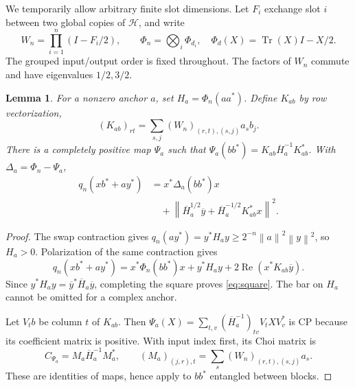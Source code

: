 \documentclass[11pt,a4paper]{article}
\newtheorem{lemma}[theorem]{Lemma}
\newcommand{\tr}{\operatorname{Tr}}
\newcommand{\HH}{\mathcal H}
\newcommand{\norm}[1]{\left\lVert#1\right\rVert}
\begin{document}
We temporarily allow arbitrary finite slot dimensions. Let $F_i$ exchange slot $i$ between two global copies of $\HH$, and write
\[
 W_n=\prod_{i=1}^n(I-F_i/2),\qquad
 \Phi_n=\bigotimes_i\Phi_{d_i},\quad \Phi_d(X)=\tr(X)I-X/2.
\]
The grouped input/output order is fixed throughout. The factors of $W_n$ commute and have eigenvalues $1/2,3/2$.
\begin{lemma}\label{lem:schur}
For a nonzero anchor $a$, set $H_a=\Phi_n(aa^*)$. Define $K_{ab}$ by row vectorization,
\begin{equation}\label{eq:K}
 (K_{ab})_{rt}=\sum_{s,j}(W_n)_{(r,t),(s,j)}a_s b_j .
\end{equation}
There is a completely positive map $\Psi_a$ such that
$\Psi_a(bb^*)=K_{ab}\overline H_a^{-1}K_{ab}^*$. With $\Delta_a=\Phi_n-\Psi_a$,
\begin{align}\label{eq:square}
 q_n(xb^*+ay^*)&=x^*\Delta_a(bb^*)x\\
 &\quad+\norm{\overline H_a^{1/2}\overline y+
          \overline H_a^{-1/2}K_{ab}^*x}^2.\nonumber
\end{align}
\end{lemma}
\begin{proof}
The swap contraction gives
$q_n(ay^*)=y^*H_a y\ge2^{-n}\norm a^2\norm y^2$, so $H_a>0$. Polarization of the same contraction gives
\[
 q_n(xb^*+ay^*)=
 x^*\Phi_n(bb^*)x+y^*H_a y+
 2\operatorname{Re}(x^*K_{ab}\overline y).
\]
Since $y^*H_a y=\overline y^*\overline H_a\overline y$, completing the square proves \eqref{eq:square}. The bar on $H_a$ cannot be omitted for a complex anchor.

Let $V_t b$ be column $t$ of $K_{ab}$. Then
$\Psi_a(X)=\sum_{t,v}(\overline H_a^{-1})_{tv}V_t X V_v^*$ is CP because its coefficient matrix is positive. With input index first, its Choi matrix is
\begin{equation}\label{eq:choi}
 C_{\Psi_a}=M_a\overline H_a^{-1}M_a^*,\qquad
 (M_a)_{(j,r),t}=\sum_s(W_n)_{(r,t),(s,j)}a_s .
\end{equation}
These are identities of maps, hence apply to $bb^*$ entangled between blocks.
\end{proof}
\end{document}
